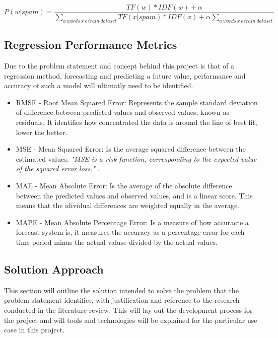 \documentclass[oneside, 12pt]{article}
\begin{document}
			\[P(w|spam) = \frac{TF(w)*IDF(w) + \alpha}{\sum _{a\ words\ x\ \epsilon\ train\ dataset} TF(x|spam)*IDF(x) + \alpha\sum_{a\ words\ x\ \epsilon\ train\ dataset}}\]
			
			\subsection{Regression Performance Metrics}
			Due to the problem statement and concept behind this project is that of a regression method, forecasting and predicting a future value, performance and accuracy of such a model will ultimatly need to be identified.
			
			\begin{itemize}
				\item RMSE - Root Mean Squared Error: Represents the sample standard deviation of difference between predicted values and observed values, known as residuals. It identifies how concentrated the data is around the line of best fit, lower the better. \cite{RMSEMAE}
				\item MSE - Mean Squared Error: Is the average squared difference between the estimated values. \textit{"MSE is a risk function, corresponding to the expected value of the squared error loss."} \cite{MSE}.
				\item MAE - Mean Absolute Error: Is the average of the absolute difference between the predicted values and observed values, and is a linear score. This means that the idividual differences are weighted equally in the average. \cite{RMSEMAE}
				\item MAPE - Mean Absolute Percentage Error: Is a measure of how accuracte a forecast system is, it measures the accuracy as a percentage error for each time period minus the actual valuse divided by the actual values. \cite{MAPE}
			\end{itemize}
		
	\newpage
	
	\begin{center}
		\section{Solution Approach}\label{solution}
	\end{center}
		This section will outline the solution intended to solve the problem that the problem statement identifies, with justification and reference to the research conducted in the literature review. This will lay out the development process for the project and will tools and technologies will be explained for the particular use case in this project.
		\newline
		
\end{document}
